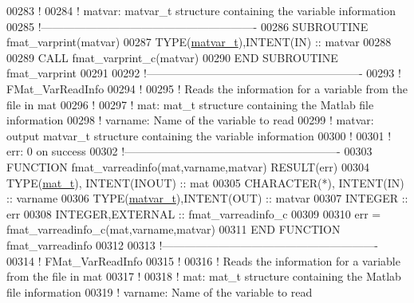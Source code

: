 \begin{DoxyCode}
00283 \textcolor{comment}{!}
00284 \textcolor{comment}{!   matvar: matvar\_t structure containing the variable information}
00285 \textcolor{comment}{!----------------------------------------------------------}
00286 \textcolor{keyword}{    SUBROUTINE }fmat\_varprint(matvar)
00287         \textcolor{keywordtype}{TYPE}(\hyperlink{group___m_a_t_structmatvar__t}{matvar\_t}),\textcolor{keywordtype}{INTENT(IN)}  :: matvar
00288 
00289         \textcolor{keyword}{CALL }fmat\_varprint\_c(matvar)
00290 \textcolor{keyword}{    END SUBROUTINE }fmat\_varprint
00291 
00292 \textcolor{comment}{!----------------------------------------------------------}
00293 \textcolor{comment}{!   FMat\_VarReadInfo}
00294 \textcolor{comment}{!}
00295 \textcolor{comment}{!   Reads the information for a variable from the file in mat}
00296 \textcolor{comment}{!}
00297 \textcolor{comment}{!   mat:     mat\_t structure containing the Matlab file information}
00298 \textcolor{comment}{!   varname: Name of the variable to read}
00299 \textcolor{comment}{!   matvar:  output matvar\_t structure containing the variable information}
00300 \textcolor{comment}{!}
00301 \textcolor{comment}{!   err: 0 on success}
00302 \textcolor{comment}{!----------------------------------------------------------}
00303 \textcolor{keyword}{    FUNCTION }fmat\_varreadinfo(mat,varname,matvar) \textcolor{keyword}{RESULT}(err)
00304         \textcolor{keywordtype}{TYPE}(\hyperlink{group___m_a_t_gab0fc888f5a5d79943b16284b1f91c2e8}{mat\_t}),   \textcolor{keywordtype}{INTENT(INOUT)}         :: mat
00305         \textcolor{keywordtype}{CHARACTER(*)},  \textcolor{keywordtype}{INTENT(IN)}            :: varname
00306         \textcolor{keywordtype}{TYPE}(\hyperlink{group___m_a_t_structmatvar__t}{matvar\_t}),\textcolor{keywordtype}{INTENT(OUT)}           :: matvar
00307         \textcolor{keywordtype}{INTEGER}                              :: err
00308         \textcolor{keywordtype}{INTEGER},\textcolor{keywordtype}{EXTERNAL}                     :: fmat\_varreadinfo\_c
00309 
00310         err = fmat\_varreadinfo\_c(mat,varname,matvar)
00311 \textcolor{keyword}{    END FUNCTION }fmat\_varreadinfo
00312 
00313 \textcolor{comment}{!----------------------------------------------------------}
00314 \textcolor{comment}{!   FMat\_VarReadInfo}
00315 \textcolor{comment}{!}
00316 \textcolor{comment}{!   Reads the information for a variable from the file in mat}
00317 \textcolor{comment}{!}
00318 \textcolor{comment}{!   mat:     mat\_t structure containing the Matlab file information}
00319 \textcolor{comment}{!   varname: Name of the variable to read}

\end{DoxyCode}
